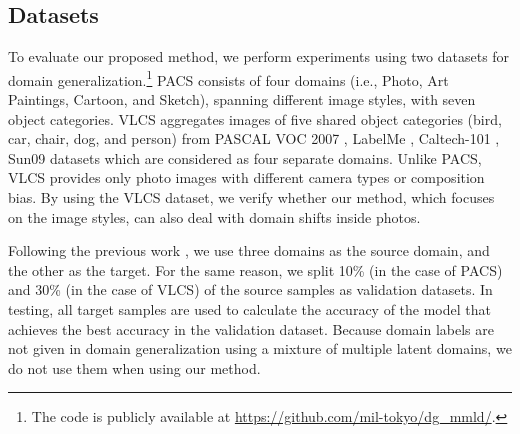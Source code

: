 \documentclass[letterpaper]{article} \usepackage{aaai20}  \usepackage{times}  \usepackage{helvet} \usepackage{courier}  \usepackage[hyphens]{url}  \usepackage{graphicx} \urlstyle{rm} \def\UrlFont{\rm}  \usepackage{graphicx}  \usepackage[whole]{bxcjkjatype}
\begin{document}
\subsection{Datasets}
To evaluate our proposed method, we perform experiments using two datasets for domain generalization.\footnote[1]{The code is publicly available at \url{https://github.com/mil-tokyo/dg_mmld/}.} PACS \cite{PACS} consists of four domains (i.e., Photo, Art Paintings, Cartoon, and Sketch), spanning different image styles, with seven object categories.
VLCS \cite{dataset_bias} aggregates images of five shared object categories (bird, car, chair, dog, and person) from PASCAL VOC 2007 \cite{VOC2007}, LabelMe \cite{labelme}, Caltech-101 \cite{caltech_101}, Sun09 datasets \cite{sun09} which are considered as four separate domains.
Unlike PACS, VLCS provides only photo images with different camera types or composition bias. By using the VLCS dataset, we verify whether our method, which focuses on the image styles, can also deal with domain shifts inside photos.\par
Following the previous work \cite{JiGen}, we use three domains as the source domain, and the other as the target. For the same reason, we split 10\% (in the case of PACS) and 30\% (in the case of VLCS) of the source samples as validation datasets.
In testing, all target samples are used to calculate the accuracy of the model that achieves the best accuracy in the validation dataset. Because domain labels are not given in domain generalization using a mixture of multiple latent domains, we do not use them when using our method.
\end{document}
